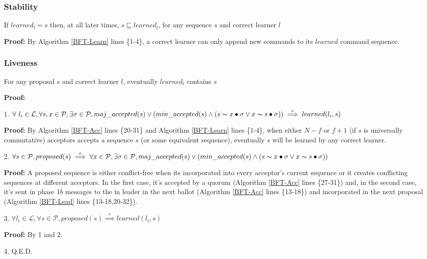 \subsubsection{Stability}
\begin{theorem}
If $learned_l = s$ then, at all later times, $s \sqsubseteq learned_l$, for any sequence $s$ and correct learner $l$ \par \label{S-T1}
\end{theorem} 
\textbf{Proof:} By Algorithm \ref{BFT-Learn} lines \{1-4\}, a correct learner can only append new commands to its $learned$ command sequence.

\subsubsection{Liveness}
\begin{theorem}
For any proposal $s$ and correct learner $l$, eventually $learned_l$ contains $s$ \label{L-T1} \par
\end{theorem} 
\parbox{\linewidth}{\textbf{Proof:}} \par
\parbox{\linewidth}{\strut1. $\forall\ l_i \in \mathcal{L},\forall s,x \in \mathcal{P}, \exists \sigma \in \mathcal{P}, maj\_accepted(s) \lor (min\_accepted(s) \land  (s \thicksim x \bullet \sigma \lor x \thicksim s \bullet \sigma))\overset{e}{\implies} learned(l_i,s)$}\par
\indent\indent\parbox{\linewidth}{\strut\textbf{Proof:} By Algorithm \ref{BFT-Acc} lines \{20-31\} and Algorithm \ref{BFT-Learn} lines \{1-4\}, when either $N-f$ or $f+1$ (if $s$ is universally commutative) acceptors accepts a sequence $s$ (or some equivalent sequence), eventually $s$ will be learned by any correct learner.}\par
\parbox{\linewidth}{\strut2. $\forall s \in \mathcal{P}, proposed(s) \overset{e}{\implies} \forall x \in \mathcal{P}, \exists \sigma \in \mathcal{P}, maj\_accepted(s) \lor (min\_accepted(s) \land  (s \thicksim x \bullet \sigma \lor x \thicksim s \bullet \sigma))$} \par
\indent\indent\parbox{\linewidth}{\strut\textbf{Proof:} A proposed sequence is either conflict-free when its incorporated into every acceptor's current sequence or it creates conflicting sequences at different acceptors. In the first case, it's accepted by a quorum (Algorithm \ref{BFT-Acc} lines \{27-31\}) and, in the second case, it's sent in phase $1b$ messages to the in leader in the next ballot (Algorithm \ref{BFT-Acc} lines \{13-18\}) and incorporated in the next proposal (Algorithm \ref{BFT-Lead} lines \{13-18,20-32\}).} \par
\parbox{\linewidth}{\strut3. $\forall l_i \in \mathcal{L}, \forall s \in \mathcal{P}, proposed(s) \overset{e}{\implies} learned(l_i,s)$} \par
\indent\indent\parbox{\linewidth}{\strut\textbf{Proof:} By 1 and 2.} \par
\parbox{\linewidth}{\strut4. Q.E.D.}